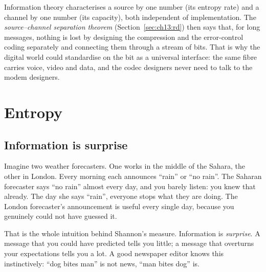\begin{keyidea}
Information theory characterises a source by one number (its entropy rate) and a channel by one
number (its capacity), both independent of implementation. The \emph{source--channel separation
theorem} (Section~\ref{sec:ch13:rd}) then says that, for long messages, nothing is lost by
designing the compression and the error-control coding separately and connecting them through a
stream of bits. That is why the digital world could standardise on the bit as a universal
interface: the same fibre carries voice, video and data, and the codec designers never need to
talk to the modem designers.
\end{keyidea}

\section{Entropy}
\label{sec:ch13:entropy}

\subsection{Information is surprise}

Imagine two weather forecasters. One works in the middle of the Sahara, the other in London.
Every morning each announces ``rain'' or ``no rain''. The Saharan forecaster says ``no rain''
almost every day, and you barely listen: you knew that already. The day she says ``rain'',
everyone stops what they are doing. The London forecaster's announcement is useful every single
day, because you genuinely could not have guessed it.

That is the whole intuition behind Shannon's measure. Information is \emph{surprise}. A message
that you could have predicted tells you little; a message that overturns your expectations tells
you a lot. A good newspaper editor knows this instinctively: ``dog bites man'' is not news, ``man
bites dog'' is.


